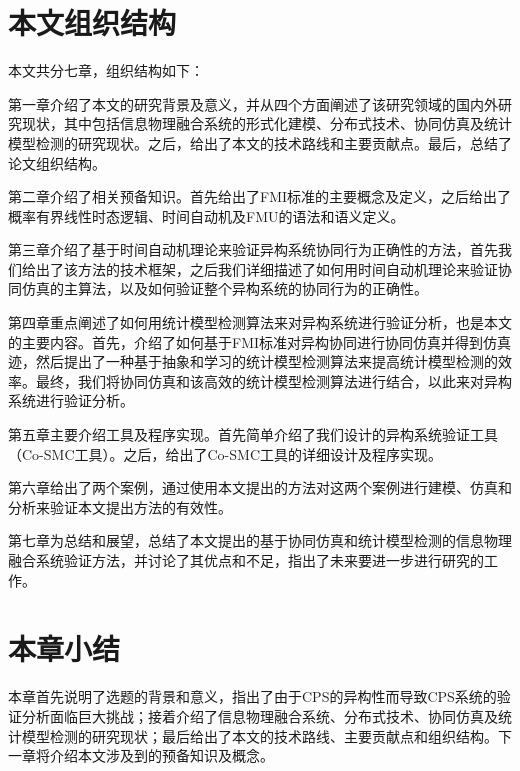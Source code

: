 \section{本文组织结构}
本文共分七章，组织结构如下：

第一章介绍了本文的研究背景及意义，并从四个方面阐述了该研究领域的国内外研究现状，其中包括信息物理融合系统的形式化建模、分布式技术、协同仿真及统计模型检测的研究现状。之后，给出了本文的技术路线和主要贡献点。最后，总结了论文组织结构。

第二章介绍了相关预备知识。首先给出了FMI标准的主要概念及定义，之后给出了概率有界线性时态逻辑、时间自动机及FMU的语法和语义定义。

第三章介绍了基于时间自动机理论来验证异构系统协同行为正确性的方法，首先我们给出了该方法的技术框架，之后我们详细描述了如何用时间自动机理论来验证协同仿真的主算法，以及如何验证整个异构系统的协同行为的正确性。

第四章重点阐述了如何用统计模型检测算法来对异构系统进行验证分析，也是本文的主要内容。首先，介绍了如何基于FMI标准对异构协同进行协同仿真并得到仿真迹，然后提出了一种基于抽象和学习的统计模型检测算法来提高统计模型检测的效率。最终，我们将协同仿真和该高效的统计模型检测算法进行结合，以此来对异构系统进行验证分析。

第五章主要介绍工具及程序实现。首先简单介绍了我们设计的异构系统验证工具（Co-SMC工具）。之后，给出了Co-SMC工具的详细设计及程序实现。

第六章给出了两个案例，通过使用本文提出的方法对这两个案例进行建模、仿真和分析来验证本文提出方法的有效性。

第七章为总结和展望，总结了本文提出的基于协同仿真和统计模型检测的信息物理融合系统验证方法，并讨论了其优点和不足，指出了未来要进一步进行研究的工作。
\section{本章小结}
本章首先说明了选题的背景和意义，指出了由于CPS的异构性而导致CPS系统的验证分析面临巨大挑战；接着介绍了信息物理融合系统、分布式技术、协同仿真及统计模型检测的研究现状；最后给出了本文的技术路线、主要贡献点和组织结构。下一章将介绍本文涉及到的预备知识及概念。

